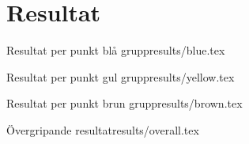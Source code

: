 \section{Resultat}


\begin{notedFrame}{Resultat per punkt blå grupp}{results/blue.tex}
\end{notedFrame}


\begin{notedFrame}{Resultat per punkt gul grupp}{results/yellow.tex}
\end{notedFrame}



\begin{notedFrame}{Resultat per punkt brun grupp}{results/brown.tex}
\end{notedFrame}

\begin{notedFrame}{Övergripande resultat}{results/overall.tex}
\end{notedFrame}
